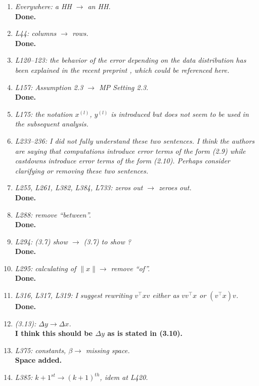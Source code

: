 \documentclass[final,onefignum,onetabnum]{siamart190516}
\begin{document}
\begin{enumerate}
    \item {\it Everywhere: a HH $\rightarrow$ an HH.}\\
    {\bf Done.}
    \item {\it L44: columns $\rightarrow$ rows.}\\
    {\bf Done.}
    \item {\it L120–123: the behavior of the error depending on the data distribution has been explained in the recent preprint \cite{HighamMary2020}, which could be referenced here.}
    \item {\it L157: Assumption 2.3 $\rightarrow$ MP Setting 2.3.}\\
    {\bf Done.}
    \item {\it L175: the notation $x^{(l)}$, $y^{(l)}$ is introduced but does not seem to be used in the
subsequent analysis.}
    \item {\it L233–236: I did not fully understand these two sentences. I think the authors are saying that computations introduce error terms of the form (2.9) while castdowns introduce error terms of the form (2.10). Perhaps consider clarifying or removing these two sentences.}
    \item {\it L255, L261, L382, L384, L733: zeros out $\rightarrow$ zeroes out.}\\
    {\bf Done.}
    \item {\it L288: remove “between”.}\\
    {\bf Done.}
    \item {\it L294: (3.7) show $\rightarrow$ (3.7) to show ?}\\
    {\bf Done.}
    \item {\it L295: calculating of $\|x\|\rightarrow$ remove ``of''.}\\
    {\bf Done.}
    \item {\it L316, L317, L319: I suggest rewriting $v^{\top}xv$ either as $vv^{\top} x$ or $(v^{\top} x)v$.}\\
    {\bf Done.}
    \item {\it (3.13): $\Delta y \rightarrow \Delta x$.}\\
    {\bf I think this should be $\Delta y$ as is stated in (3.10).}
    \item {\it L375: constants, $\beta \rightarrow$ missing space.}\\
    {\bf Space added.}
    \item {\it L385: $k+1^{st} \rightarrow (k+1)^{th}$, idem at L420.}\\

\end{enumerate}
\end{document}
